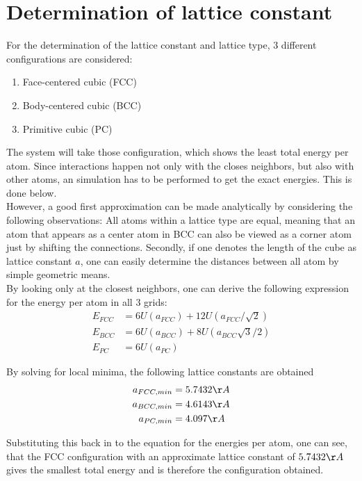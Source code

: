 \documentclass[10pt,a4paper]{report}
\begin{document}
\section{Determination of lattice constant}
For the determination of the lattice constant and lattice type, 3 different configurations are considered:
\begin{enumerate}
\item Face-centered cubic (FCC)
\item Body-centered cubic (BCC)
\item Primitive cubic     (PC)
\end{enumerate}
The system will take those configuration, which shows the least total energy per atom. Since interactions happen not only with the closes neighbors, but also with other atoms, an simulation has to be performed to get the exact energies. This is done below.\\
However, a good first approximation can be made analytically by considering the following observations: All atoms within a lattice type are equal, meaning that an atom that appears as a center atom in BCC can also be viewed as a corner atom just by shifting the connections. Secondly, if one denotes the length of the cube as lattice constant $a$, one can easily determine the distances between all atom by simple geometric means.\\
By looking only at the closest neighbors, one can derive the following expression for the energy per atom in all 3 grids:
\begin{align}
E_{FCC}&=6 U(a_{FCC})+12 U(a_{FCC}/\sqrt{2}) \\
E_{BCC}&=6 U(a_{BCC})+8 U(a_{BCC} \sqrt{3}/2) \\
E_{PC} &=6 U(a_{PC})
\end{align}

By solving for local minima, the following lattice constants are obtained
\begin{align}
a_{FCC,min}&= 5.7432\AA\\
a_{BCC,min}&= 4.6143\AA\\
a_{PC,min} &= 4.097\AA\\
\end{align}

Substituting this back in to the equation for the energies per atom, one can see, that the FCC configuration with an approximate lattice constant of $5.7432\AA$ gives the smallest total energy and is therefore the configuration obtained.\\
\end{document}
